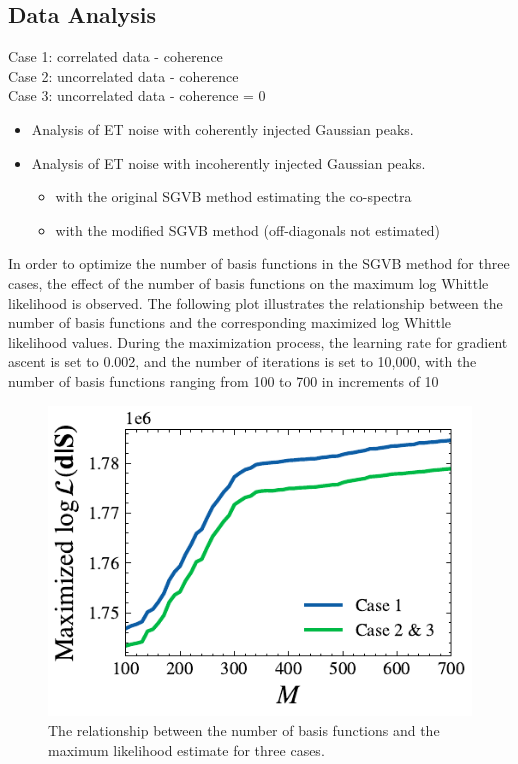 \documentclass[%
 reprint,
 amsmath,amssymb,
 aps,
]{revtex4-2}
\begin{document}
\subsection{Data Analysis}
\noindent
Case 1: correlated data - coherence \\
Case 2: uncorrelated data - coherence \\
Case 3: uncorrelated data - coherence = 0

\begin{itemize}
  \item Analysis of ET noise with coherently injected Gaussian peaks.
  \item Analysis of ET noise with incoherently injected Gaussian peaks.
  \begin{itemize}
      \item with the original SGVB method estimating the co-spectra
      \item with the modified SGVB method (off-diagonals not estimated) 
  \end{itemize}
\end{itemize}

In order to optimize the number of basis functions in the SGVB method for three cases, the effect of the number of basis functions on the maximum log Whittle likelihood is observed. The following plot illustrates the relationship between the number of basis functions and the corresponding maximized log Whittle likelihood values. During the maximization process, the learning rate for gradient ascent is set to 0.002, and the number of iterations is set to 10,000, with the number of basis functions ranging from 100 to 700 in increments of 10
\begin{figure}
\centering
  \includegraphics[width=\columnwidth]{et_basis_fns.pdf}
  \caption{The relationship between the number of basis functions and the maximum likelihood estimate for three cases. }
  \label{et_corr_basis_funs_vs_mle}
\end{figure}
\end{document}
